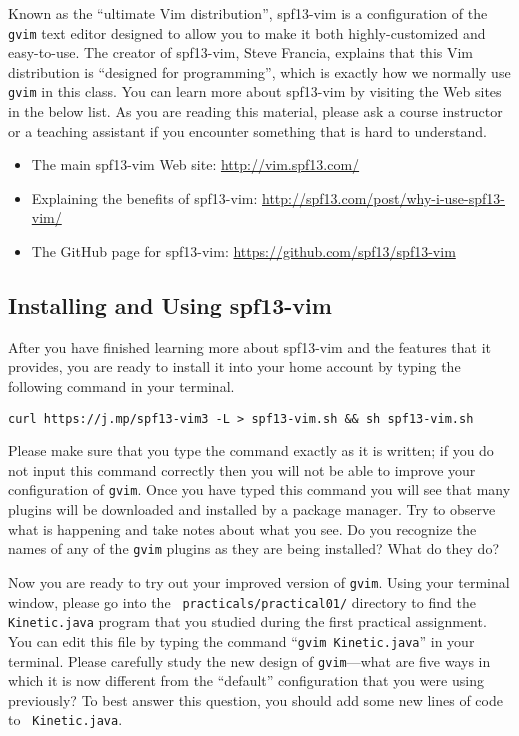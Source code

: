 Known as the ``ultimate Vim distribution'', spf13-vim is a configuration of the {\tt gvim} text editor designed to allow
you to make it both highly-customized and easy-to-use.  The creator of spf13-vim, Steve Francia, explains that this Vim
distribution is ``designed for programming'', which is exactly how we normally use {\tt gvim} in this class. You can
learn more about spf13-vim by visiting the Web sites in the below list.  As you are reading this material, please ask a course
instructor or a teaching assistant if you encounter something that is hard to understand.

\vspace*{-.1in}
\begin{itemize}
  \setlength{\itemsep}{.01in}
  \item The main spf13-vim Web site: \url{http://vim.spf13.com/}
  \item Explaining the benefits of spf13-vim: \url{http://spf13.com/post/why-i-use-spf13-vim/}
  \item The GitHub page for spf13-vim: \url{https://github.com/spf13/spf13-vim}
\end{itemize}

\vspace*{-.30in}
\subsection*{Installing and Using spf13-vim} 
\vspace*{-.05in}

After you have finished learning more about spf13-vim and the features that it provides, you are ready to install it
into your home account by typing the following command in your terminal.

\begin{code}
  {\tt curl https://j.mp/spf13-vim3 -L > spf13-vim.sh \&\& sh spf13-vim.sh}
\end{code}

Please make sure that you type the command exactly as it is written; if you do not input this command correctly then you
will not be able to improve your configuration of {\tt gvim}. Once you have typed this command you will see that many
plugins will be downloaded and installed by a package manager.  Try to observe what is happening and take notes about
what you see. Do you recognize the names of any of the {\tt gvim} plugins as they are being installed? What do they do?

Now you are ready to try out your improved version of {\tt gvim}.  Using your terminal window, please go into the {\tt
  practicals/practical01/} directory to find the {\tt Kinetic.java} program that you studied during the first practical
assignment. You can edit this file by typing the command ``{\tt gvim Kinetic.java}'' in your terminal. Please carefully
study the new design of {\tt gvim}---what are five ways in which it is now different from the ``default'' configuration
that you were using previously? To best answer this question, you should add some new lines of code to {\tt
  Kinetic.java}.

